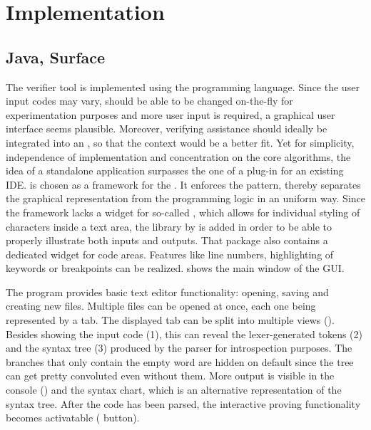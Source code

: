 %
%
%

\chapter{Implementation}
\label{ch:Implementation}

\section{Java, Surface}
The verifier tool is implemented using the  programming language. Since the user input codes may vary, should be able to be changed on-the-fly for experimentation purposes and more user input is required, a graphical user interface seems plausible. Moreover, verifying assistance should ideally be integrated into an , so that the context would be a better fit. Yet for simplicity, independence of implementation and concentration on the core algorithms, the idea of a standalone application surpasses the one of a plug-in for an existing IDE.  is chosen as a framework for the . It enforces the  pattern, thereby separates the graphical representation from the programming logic in an uniform way. Since the framework lacks a widget for so-called , which allows for individual styling of characters inside a text area, the  library by  is added in order to be able to properly illustrate both inputs and outputs. That package also contains a dedicated widget for code areas. Features like line numbers, highlighting of keywords or breakpoints can be realized.  shows the main window of the GUI.

The program provides basic text editor functionality: opening, saving and creating new files. Multiple files can be opened at once, each one being represented by a tab. The displayed tab can be split into multiple views (). Besides showing the input code (1), this can reveal the lexer-generated tokens (2) and the syntax tree (3) produced by the parser for introspection purposes. The branches that only contain the empty word are hidden on default since the tree can get pretty convoluted even without them. More output is visible in the console () and the syntax chart, which is an alternative representation of the syntax tree. After the code has been parsed, the interactive proving functionality becomes activatable ( button).

